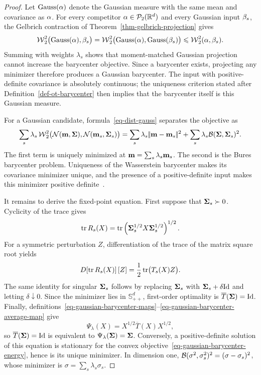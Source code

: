 \begin{proof}
	Let $\operatorname{Gauss}(\alpha)$ denote the Gaussian measure with the same mean and covariance as $\alpha$. For every competitor $\alpha\in\mathcal{P}_2(\mathbb{R}^d)$ and every Gaussian input $\beta_s$, the Gelbrich contraction of Theorem~\ref{thm-gelbrich-projection} gives
	\[
		\operatorname{\mathcal{W}}_2^2\bigl(\operatorname{Gauss}(\alpha),\beta_s\bigr)
		=
		\operatorname{\mathcal{W}}_2^2\bigl(\operatorname{Gauss}(\alpha),\operatorname{Gauss}(\beta_s)\bigr)
		\leqslant
		\operatorname{\mathcal{W}}_2^2(\alpha,\beta_s).
	\]
	Summing with weights $\lambda_s$ shows that moment-matched Gaussian projection cannot increase the barycenter objective. Since a barycenter exists, projecting any minimizer therefore produces a Gaussian barycenter. The input with positive-definite covariance is absolutely continuous; the uniqueness criterion stated after Definition~\ref{def-ot-barycenter} then implies that the barycenter itself is this Gaussian measure.

	For a Gaussian candidate, formula~\eqref{eq-dist-gauss} separates the objective as
	\[
		\sum_s\lambda_s\operatorname{\mathcal{W}}_2^2\bigl(\mathcal{N}(\mathbf{m},\mathbf{\Sigma}),\mathcal{N}(\mathbf{m}_s,\mathbf{\Sigma}_s)\bigr)
		=
		\sum_s\lambda_s|\!| \mathbf{m}-\mathbf{m}_s |\!|^2
		+
		\sum_s\lambda_s\mathcal{B}(\mathbf{\Sigma},\mathbf{\Sigma}_s)^2.
	\]
	The first term is uniquely minimized at $\mathbf{m}=\sum_s\lambda_s\mathbf{m}_s$. The second is the Bures barycenter problem. Uniqueness of the Wasserstein barycenter makes its covariance minimizer unique, and the presence of a positive-definite input makes this minimizer positive definite~\cite{alvarez2016fixed,bhatia2018bures}.

	It remains to derive the fixed-point equation. First suppose that $\mathbf{\Sigma}_s\succ0$. Cyclicity of the trace gives
	\[
		\operatorname{tr} R_s(X)
		=
		\operatorname{tr}\left( \mathbf{\Sigma}_s^{1/2}X\mathbf{\Sigma}_s^{1/2} \right)^{1/2}.
	\]
	For a symmetric perturbation $Z$, differentiation of the trace of the matrix square root yields
	\[
		D\!\left[\operatorname{tr} R_s(X)\right][Z]
		=
		\frac12\operatorname{tr}\bigl(T_s(X)Z\bigr).
	\]
	The same identity for singular $\mathbf{\Sigma}_s$ follows by replacing $\mathbf{\Sigma}_s$ with $\mathbf{\Sigma}_s+\delta\mathrm{Id}$ and letting $\delta\downarrow0$. Since the minimizer lies in $\mathbb S_{++}^d$, first-order optimality is $\overline T(\mathbf{\Sigma})=\mathrm{Id}$. Finally, definitions~\eqref{eq-gaussian-barycenter-maps}--\eqref{eq-gaussian-barycenter-average-map} give
	\[
		\Psi_\lambda(X)
		=
		X^{1/2}\overline T(X)X^{1/2},
	\]
	so $\overline T(\mathbf{\Sigma})=\mathrm{Id}$ is equivalent to $\Psi_\lambda(\mathbf{\Sigma})=\mathbf{\Sigma}$. Conversely, a positive-definite solution of this equation is stationary for the convex objective~\eqref{eq-gaussian-barycenter-energy}, hence is its unique minimizer. In dimension one, $\mathcal{B}(\sigma^2,\sigma_s^2)^2=(\sigma-\sigma_s)^2$, whose minimizer is $\sigma=\sum_s\lambda_s\sigma_s$.
\end{proof}

